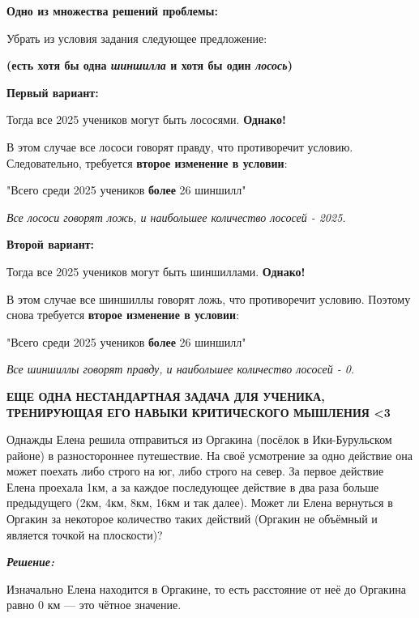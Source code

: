 \newpage
\hspace{3mm}

\textbf{Одно из множества решений проблемы: }

Убрать из условия задания следующее предложение:

\textbf{(есть хотя бы одна \textit{шиншилла} и хотя бы один \textit{лосось})}

\textbf{Первый вариант:}

Тогда все 2025 учеников могут быть лососями. \textbf{Однако!}

В этом случае все лососи говорят правду, что противоречит условию. Следовательно, требуется \textbf{второе изменение в условии}:

"Всего среди 2025 учеников \textbf{более} 26 шиншилл"

\textit{Все лососи говорят ложь, и наибольшее количество лососей - 2025.}

\textbf{Второй вариант:}

Тогда все 2025 учеников могут быть шиншиллами. \textbf{Однако!}

В этом случае все шиншиллы говорят ложь, что противоречит условию. Поэтому снова требуется \textbf{второе изменение в условии}:

"Всего среди 2025 учеников \textbf{более} 26 шиншилл"

\textit{Все шиншиллы говорят правду, и наибольшее количество лососей - 0.}

\textbf{ЕЩЕ ОДНА НЕСТАНДАРТНАЯ ЗАДАЧА ДЛЯ УЧЕНИКА, ТРЕНИРУЮЩАЯ ЕГО НАВЫКИ КРИТИЧЕСКОГО МЫШЛЕНИЯ <3}


\hspace{3mm}

 Однажды Елена решила отправиться из Оргакина (посёлок в Ики-Бурульском районе) в разностороннее путешествие. На своё усмотрение за одно действие она может поехать либо строго на юг, либо строго на север. За первое действие Елена проехала 1км, а за каждое последующее действие в два раза больше предыдущего (2км, 4км, 8км, 16км и так далее). Может ли Елена вернуться в Оргакин за некоторое количество таких действий (Оргакин не объёмный и является точкой на плоскости)?

\newpage
\hspace{3mm}

\centerline{\textbf{\textit{Решение:}}}

Изначально Елена находится в Оргакине, то есть расстояние от неё до Оргакина равно 0 км — это чётное значение.

